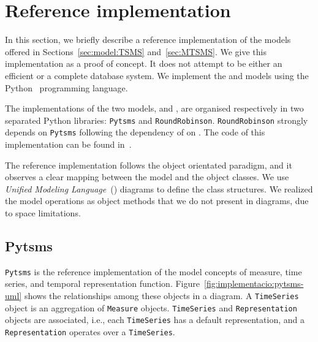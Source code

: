 \section{Reference implementation}
\label{sec:implementation}

In this section, we briefly describe a reference implementation of the
models offered in Sections~\ref{sec:model:TSMS}
and~\ref{sec:MTSMS}. We give this implementation as a proof of
concept. It does not attempt to be either an efficient or a complete
database system. We implement the  and  models
using the Python~\cite{python:doc2} programming language.

The implementations of the two models,  and
, are organised respectively in two separated Python
libraries: \texttt{Pytsms} and \texttt{RoundRobinson}.
\texttt{RoundRobinson} strongly depends on \texttt{Pytsms} following
the dependency of  on .  The code of this
implementation can be found in~\cite{llusa:roundrobinson}.

The reference implementation follows the object orientated paradigm,
and it observes a clear mapping between the model and the object
classes. We use \emph{Unified Modeling Language}~() diagrams
to define the class structures. We realized the model operations as
object methods that we do not present in  diagrams, due to
space limitations.


\subsection{Pytsms}

\texttt{Pytsms} is the reference implementation of the model concepts
of measure, time series, and temporal representation function.
Figure~\ref{fig:implementacio:pytsms-uml} shows the relationships
among these objects in a  diagram. A \texttt{TimeSeries}
object is an aggregation of \texttt{Measure}
objects. \texttt{TimeSeries} and \texttt{Representation} objects are
associated, i.e., each \texttt{TimeSeries} has a default
representation, and a \texttt{Representation} operates over a
\texttt{TimeSeries}.

